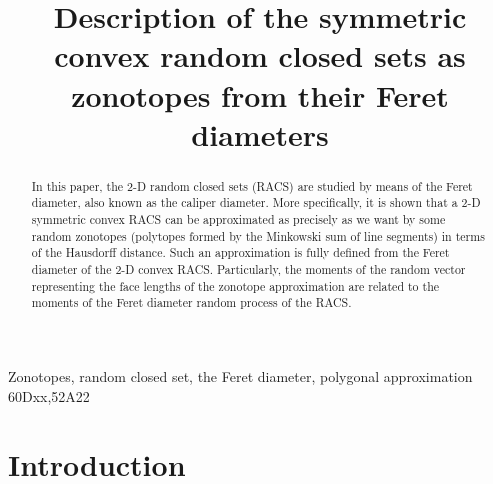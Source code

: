 \documentclass[numbers,compress,v1.0.1]{vmsta}
\theoremstyle{definition}
\begin{document}
%
\begin{frontmatter}

\title{Description of the symmetric convex random closed sets as
zonotopes from their Feret diameters}

\author{}
\author{}
\author{}

\address{\'{E}cole Nationale Sup\'erieure des Mines de Saint-Etienne, SPIN/LGF UMR CNRS~5307, 158 Cours Fauriel, 42023 Saint-Etienne, France}


\begin{abstract}
In this paper, the 2-D random closed sets (RACS) are studied by means
of the Feret diameter, also known as the caliper diameter. More
specifically, it is shown that a 2-D symmetric convex RACS can be
approximated as precisely as we want by some random zonotopes
(polytopes formed by the Minkowski sum of line segments) in terms of
the Hausdorff distance. Such an approximation is fully defined from the
Feret diameter of the 2-D convex RACS. Particularly, the moments of the
random vector representing the face lengths of the zonotope
approximation are related to the moments of the Feret diameter random
process of the RACS.
\end{abstract}

\begin{keyword}
Zonotopes\sep
random closed set\sep
the Feret diameter\sep
polygonal approximation
\MSC[2010] 60Dxx\sep52A22
\end{keyword}

%
%
%
\end{frontmatter}

\section{Introduction}
\end{document}
